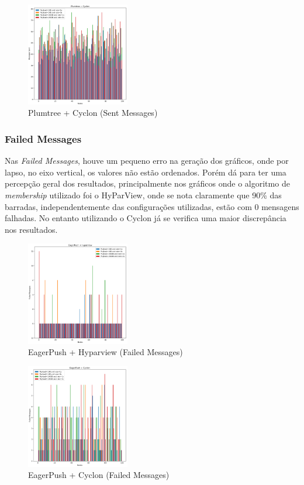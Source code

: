 \begin{figure}
  \includegraphics[width=0.4\textwidth]{images/Plumtree + CyclonSent.png}
  \caption{Plumtree + Cyclon (Sent Messages)}
\end{figure}


\subsubsection{Failed Messages}

Nas \textit{Failed Messages}, houve um pequeno erro na geração dos gráficos, onde por lapso, no eixo vertical, os valores não estão ordenados. Porém dá para ter uma percepção geral dos resultados, principalmente nos gráficos onde o algoritmo de \textit{membership} utilizado foi o HyParView, onde se nota claramente que 90\% das barradas, independentemente das configurações utilizadas, estão com 0 mensagens falhadas. No entanto utilizando o Cyclon já se verifica uma maior discrepância nos resultados.

\begin{figure}
  \includegraphics[width=0.4\textwidth]{images/EagerPush + HyparviewFailedMessages.png}
  \caption{EagerPush + Hyparview (Failed Messages)}
\end{figure}

\begin{figure}
  \includegraphics[width=0.4\textwidth]{images/EagerPush + CyclonFailedMessages.png}
  \caption{EagerPush + Cyclon (Failed Messages)}
\end{figure}

